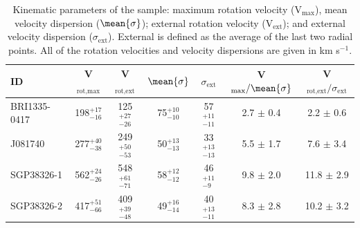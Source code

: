 \begin{table}
\begin{center}
\caption{Kinematic parameters of the sample: maximum rotation velocity (V$_{\textrm{max}}$), mean velocity dispersion ($\mean{\sigma}$); external rotation velocity (V$_{\textrm{ext}}$); and external velocity dispersion ($\sigma_{\textrm{ext}}$). External is defined as the average of the last two radial points. All of the rotation velocities and velocity dispersions are given in km s$^{-1}$. }\label{tab:vel}
\begin{tabular}{lcccccc}
\hline \hline
ID    & V$_{\textrm{rot,max}}$ & V$_{\textrm{rot,ext}}$ & $\mean{\sigma}$ & $\sigma_{\textrm{ext}}$ & V$_{\textrm{max}}/\mean{\sigma}$ & V$_{\textrm{rot,ext}}/\sigma_{\mathrm{ext}}$ \\ \hline \vspace{2mm}
BRI1335-0417 & 198$^{+17}_{-16}$ & 125$^{+27}_{-26}$ & 75$^{+10}_{-10}$ & 57$^{+11}_{-11}$ & 2.7 $\pm$ 0.4 & 2.2 $\pm$ 0.6 \\ \vspace{2mm}
J081740      & 277$^{+40}_{-38}$ & 249$^{+50}_{-53}$ & 50$^{+13}_{-13}$ & 33$^{+13}_{-13}$ & 5.5 $\pm$ 1.7 & 7.6 $\pm$ 3.4 \\ \vspace{2mm}
SGP38326-1   & 562$^{+24}_{-26}$ & 548$^{+61}_{-71}$ & 58$^{+12}_{-12}$ & 46$^{+11}_{-9}$ & 9.8 $\pm$ 2.0 & 11.8 $\pm$ 2.9 \\ 
SGP38326-2   & 417$^{+51}_{-66}$ & 409$^{+39}_{-48}$ & 49$^{+16}_{-14}$ & 40$^{+13}_{-11}$ & 8.3 $\pm$ 2.8 & 10.2 $\pm$ 3.2 \\ \hline
\end{tabular}
\end{center}
\end{table}
